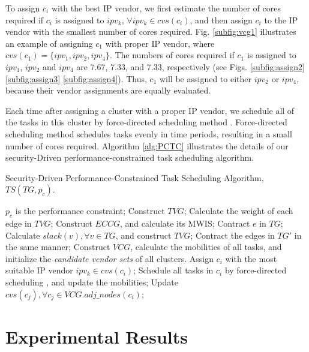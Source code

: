 \documentclass[conference]{IEEEtran}
\begin{document}
To assign $c_i$ with the best IP vendor, we first estimate the number of cores required if $c_i$ is assigned to $ipv_k$, $\forall ipv_k\in cvs(c_i)$, and then assign $c_i$ to the IP vendor with the smallest number of cores required. Fig. \ref{subfig:vcg1} illustrates an example of assigning $c_1$ with proper IP vendor, where $cvs(c_1)=\{ipv_1, ipv_2, ipv_4\}$. The numbers of cores required if $c_1$ is assigned to $ipv_1$, $ipv_2$ and $ipv_4$ are 7.67, 7.33, and 7.33, respectively (see Figs. \ref{subfig:assign2} \ref{subfig:assign3} \ref{subfig:assign4}). Thus, $c_1$ will be assigned to either $ipv_2$ or $ipv_4$, because their vendor assignments are equally evaluated.



Each time after assigning a cluster with a proper IP vendor, we schedule all of the tasks in this cluster by force-directed scheduling method \cite{article:PP}. Force-directed scheduling method schedules tasks evenly in time periods, resulting in a small number of cores required. Algorithm \ref{alg:PCTC} illustrates the details of our security-Driven performance-constrained task scheduling algorithm.




\begin{algorithm}[!h]
\caption{Security-Driven Performance-Constrained Task Scheduling Algorithm, $TS(TG, p_c)$.}
\label{alg:PCTC}
\begin{algorithmic}[1]
\STATE $p_c$ is the performance constraint;
\STATE Construct $TVG$;
\STATE Calculate the weight of each edge in $TVG$;
\STATE Construct $ECCG$, and calculate its MWIS;
    \STATE Contract $e$ in $TG$;
\ENDFOR
\STATE Calculate $slack(v), \forall v\in TG$, and construct $TVG$;
\ENDWHILE
\STATE Contract the edges in $TG'$ in the same manner;
\STATE Construct $VCG$, calculate the mobilities of all tasks, and initialize the \textit{candidate vendor sets} of all clusters.
    \STATE Assign $c_i$ with the most suitable IP vendor $ipv_k\in cvs(c_i)$;
    \STATE Schedule all tasks in $c_i$ by force-directed scheduling \cite{article:PP}, and update the mobilities;
    \STATE Update $cvs(c_j), \forall c_j \in VCG.adj\_nodes(c_i)$;
\ENDFOR
\end{algorithmic}
\end{algorithm}


\section{Experimental Results}
\end{document}
